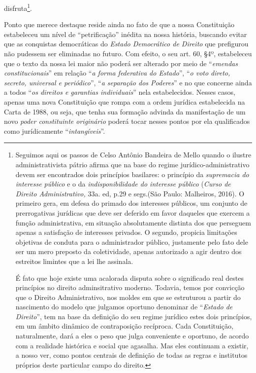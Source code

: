 disfruta\footnote{Seguimos aqui os passos de Celso Antônio Bandeira de
  Mello quando o ilustre administrativista pátrio afirma que na base do
  regime jurídico-administrativo devem ser encontrados dois princípios
  basilares: o princípio da \emph{supremacia do interesse público} e o
  da \emph{indisponibilidade do interesse público} (\emph{Curso de
  Direito Administrativo,} 33a. ed, p.29 e segs.(São Paulo: Malheiros,
  2016). O primeiro gera, em defesa do primado dos interesses públicos,
  um conjunto de prerrogativas jurídicas que deve ser deferido em favor
  daqueles que exercem a função administrativa, em situação
  absolutamente distinta dos que perseguem apenas a satisfação de
  interesses privados. O segundo, propicia limitações objetivas de
  conduta para o administrador público, justamente pelo fato dele ser um
  mero preposto da coletividade, apenas autorizado a agir dentro dos
  estreitos limintes que a lei lhe assinala.

  É fato que hoje existe uma acalorada disputa sobre o significado real
  destes princípios no direito adminsitrativo moderno. Todavia, temos
  por convicção que o Direito Administrativo, nos moldes em que se
  estruturou a partir do nascimento do modelo que julgamos oportuno
  denominar de ``\emph{Estado de Direito}'', tem na base da definição do
  seu regime jurídico estes dois princípios, em um âmbito dinâmico de
  contraposição recíproca. Cada Constituição, naturalmente, dará a eles
  o peso que julga conveniente e oportuno, de acordo com a realidade
  histórica e social que agasalha. Mas eles continuam a existir, a nosso
  ver, como pontos centrais de definição de todas as regras e institutos
  próprios deste particular campo do direito.}.

Ponto que merece destaque reside ainda no fato de que a nossa
Constituição estabeleceu um nível de ``petrificação'' inédita na nossa
história, buscando evitar que as conquistas democráticas do \emph{Estado
Democrático de Direito} que prefigurou não pudessem ser eliminadas no
futuro. Com efeito, o seu art. 60, §4º, estabeleceu que o texto da nossa
lei maior não poderá ser alterado por meio de ``\emph{emendas
constitucionais}'' em relação ``\emph{a forma federativa do Estado}'',
``\emph{o voto direto, secreto, universal e periódico}'', ``\emph{a
separação dos Poderes}'' e no que concerne ainda a todos ``\emph{os
direitos e garantias individuais}'' nela estabelecidos. Nesses casos,
apenas uma nova Constituição que rompa com a ordem jurídica estabelecida
na Carta de 1988, ou seja, que tenha sua formação advinda da
manifestação de um novo \emph{poder constituinte originário} poderá
tocar nesses pontos por ela qualificados como jurídicamente
``\emph{intangíveis}''.

